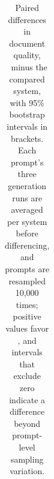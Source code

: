 \begin{table}[H]
\begin{tabular}{lrrrrr}
\bottomrule
\end{tabular}
\caption{Paired differences in document quality, \condAgenticCogWriter\ minus the compared system, with 95\% bootstrap intervals in brackets. Each prompt's three generation runs are averaged per system before differencing, and prompts are resampled 10,000 times; positive values favor \condAgenticCogWriter, and intervals that exclude zero indicate a difference beyond prompt-level sampling variation.}
\label{tab:paired-quality}
\end{table}
